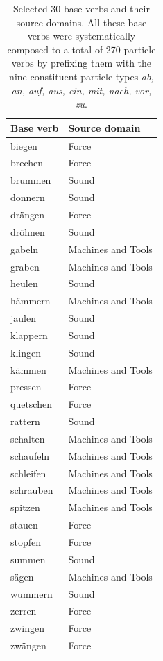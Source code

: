\documentclass[output=paper]{langsci/langscibook}
\begin{document}
\begin{table}
  \caption{Selected 30 base verbs and their source domains. All these
    base verbs were systematically composed to a total of 270 particle
    verbs by prefixing them with the nine constituent particle types
    \textit{ab, an, auf, aus, ein, mit, nach, vor, zu}.}
  \label{tab:bv-sd}

  \centering
  \begin{tabular}{ll}

    Base verb & Source domain \\ \hline

    biegen & Force \\
    brechen & Force \\
    brummen & Sound \\
    donnern & Sound \\
    drängen & Force \\
    dröhnen & Sound \\
    gabeln & Machines and Tools \\
    graben & Machines and Tools \\
    heulen & Sound \\
    hämmern & Machines and Tools \\
    jaulen & Sound \\
    klappern & Sound \\
    klingen & Sound \\
    kämmen & Machines and Tools \\
    pressen & Force \\
    quetschen & Force \\
    rattern & Sound \\
    schalten & Machines and Tools \\
    schaufeln & Machines and Tools \\
    schleifen & Machines and Tools \\
    schrauben & Machines and Tools \\
    spitzen & Machines and Tools \\
    stauen & Force \\
    stopfen & Force \\
    summen & Sound \\
    sägen & Machines and Tools \\
    wummern & Sound \\
    zerren & Force \\
    zwingen & Force \\
    zwängen & Force \\

  \end{tabular}
\end{table}
\end{document}
